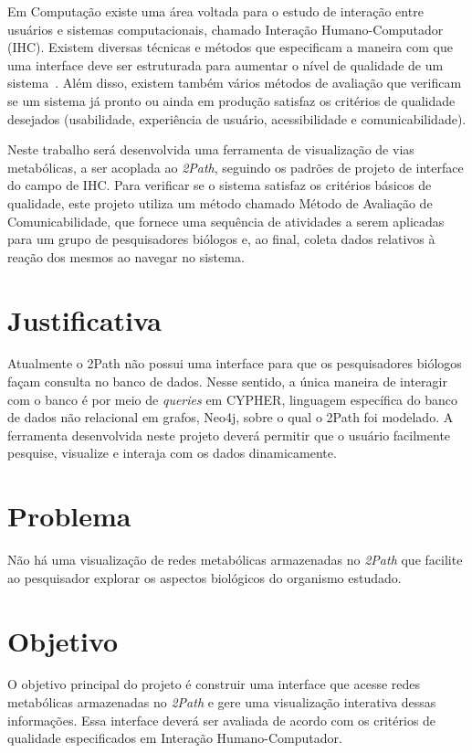 \indent Em Computação existe uma área voltada para o estudo de interação entre usuários e sistemas computacionais, chamado Interação Humano-Computador (IHC). Existem diversas técnicas e métodos que especificam a maneira com que uma interface deve ser estruturada para aumentar o nível de qualidade de um sistema~\cite{IHCbook}. Além disso, existem também vários métodos de avaliação que verificam se um sistema já pronto ou ainda em produção satisfaz os critérios de qualidade~\cite{IHCbook} desejados (usabilidade, experiência de usuário, acessibilidade e comunicabilidade).

\indent Neste trabalho será desenvolvida uma ferramenta de visualização de vias metabólicas, a ser acoplada ao \textit{2Path}, seguindo os padrões de projeto de interface do campo de IHC. Para verificar se o sistema satisfaz os critérios básicos de qualidade, este projeto utiliza um método chamado Método de Avaliação de Comunicabilidade, que fornece uma sequência de atividades a serem aplicadas para um grupo de pesquisadores biólogos e, ao final, coleta dados relativos à reação dos mesmos ao navegar no sistema.


\section{Justificativa}
\indent Atualmente o 2Path não possui uma interface para que os pesquisadores biólogos façam consulta no banco de dados. Nesse sentido, a única maneira de interagir com o banco é por meio de \textit{queries} em CYPHER, linguagem específica do banco de dados não relacional em grafos, Neo4j, sobre o qual o 2Path foi modelado. A ferramenta desenvolvida neste projeto deverá permitir que o usuário facilmente pesquise, visualize e interaja com os dados dinamicamente.

\section{Problema}
\indent Não há uma visualização de redes metabólicas armazenadas no \textit{2Path} que facilite ao pesquisador explorar os aspectos biológicos do organismo estudado.

\section{Objetivo}
\indent O objetivo principal do projeto é construir uma interface que acesse redes metabólicas armazenadas no \textit{2Path} e gere uma visualização interativa dessas informações. Essa interface deverá ser avaliada de acordo com os critérios de qualidade especificados em Interação Humano-Computador.

